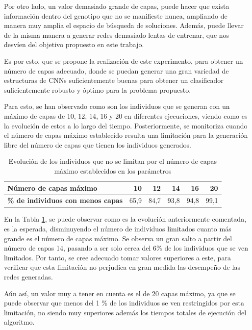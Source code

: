 Por otro lado, un valor demasiado grande de capas, puede hacer que exista información dentro del genotipo que no se manifieste nunca, ampliando de manera muy amplia el espacio de búsqueda de soluciones. Además, puede llevar de la misma manera a generar redes demasiado lentas de entrenar, que nos desvíen del objetivo propuesto en este trabajo.

Es por esto, que se propone la realización de este experimento, para obtener un número de capas adecuado, donde se puedan generar una gran variedad de estructuras de CNNs suficientemente buenas para obtener un clasificador suficientemente robusto y óptimo para la problema propuesto.

Para esto, se han observado como son los individuos que se generan con un máximo de capas de 10, 12, 14, 16 y 20 en diferentes ejecuciones, viendo como es la evolución de estos a lo largo del tiempo. Posteriormente, se monitoriza cuando el número de capas máximo establecido resulta una limitación para la generación libre del número de capas que tienen los individuos generados.

\begin{table}[h]
\caption{Evolución de los individuos que no se limitan por el número de capas máximo establecidos en los parámetros}
\label{tab:numero_capas}
\centering
\begin{tabular}{l|rrrrr}
\toprule
\textbf{Número de capas máximo}            & 10   & 12   & 14   & 16   & 20   \\ \hline
\textbf{\% de individuos con menos capas} & 65,9 & 84,7 & 93,8 & 94,8 & 99,1\\
\bottomrule
\end{tabular}
\end{table}

En la Tabla \ref{tab:numero_capas}, se puede observar como es la evolución anteriormente comentada, es la esperada, disminuyendo el número de individuos limitados cuanto más grande es el número de capas máximo. Se observa un gran salto a partir del número de capas 14, pasando a ser solo cerca del 6\% de los individuos que se ven limitados. Por tanto, se cree adecuado tomar valores superiores a este, para verificar que esta limitación no perjudica en gran medida las desempeño de las redes generadas.

Aún así, un valor muy a tener en cuenta es el de 20 capas máximo, ya que se puede observar que menos del 1 \% de los individuos se ven restringidos por esta limitación, no siendo muy superiores además los tiempos totales de ejecución del algoritmo.


